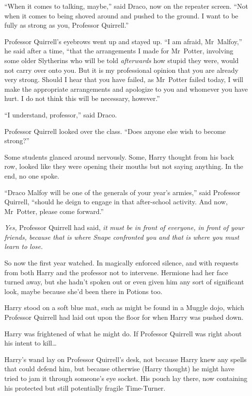 “When it comes to talking, maybe,” said Draco, now on the repeater screen. “Not when it comes to being shoved around and pushed to the ground. I want to be fully as strong as you, Professor Quirrell.”

Professor Quirrell’s eyebrows went up and stayed up. “I am afraid, Mr~Malfoy,” he said after a time, “that the arrangements I made for Mr~Potter, involving some older Slytherins who will be told \emph{afterwards} how stupid they were, would not carry over onto you. But it is my professional opinion that you are already very strong. Should I hear that you have failed, as Mr~Potter failed today, I will make the appropriate arrangements and apologize to you and whomever you have hurt. I do not think this will be necessary, however.”

“I understand, professor,” said Draco.

Professor Quirrell looked over the class. “Does anyone else wish to become strong?”

Some students glanced around nervously. Some, Harry thought from his back row, looked like they were opening their mouths but not saying anything. In the end, no one spoke.

“Draco Malfoy will be one of the generals of your year’s armies,” said Professor Quirrell, “should he deign to engage in that after-school activity. And now, Mr~Potter, please come forward.”

\later

\emph{Yes,} Professor Quirrell had said, \emph{it must be in front of everyone, in front of your friends, because that is where Snape confronted you and that is where you must learn to lose.}

So now the first year watched. In magically enforced silence, and with requests from both Harry and the professor not to intervene. Hermione had her face turned away, but she hadn’t spoken out or even given him any sort of significant look, maybe because she’d been there in Potions too.

Harry stood on a soft blue mat, such as might be found in a Muggle dojo, which Professor Quirrell had laid out upon the floor for when Harry was pushed down.

Harry was frightened of what he might do. If Professor Quirrell was right about his intent to kill…

Harry’s wand lay on Professor Quirrell’s desk, not because Harry knew any spells that could defend him, but because otherwise (Harry thought) he might have tried to jam it through someone’s eye socket. His pouch lay there, now containing his protected but still potentially fragile Time-Turner.

